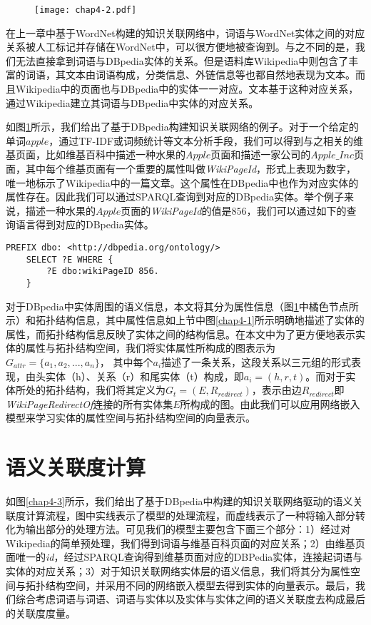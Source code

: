 \begin{figure}[!ht]
    \centerline{\texttt{[image: chap4-2.pdf]}}
    \label{chap4-2}
\end{figure}

在上一章中基于WordNet构建的知识关联网络中，词语与WordNet实体之间的对应关系被人工标记并存储在WordNet中，可以很方便地被查询到。与之不同的是，我们无法直接拿到词语与DBpedia实体的关系。但是语料库Wikipedia中则包含了丰富的词语，其文本由词语构成，分类信息、外链信息等也都自然地表现为文本。而且Wikipedia中的页面也与DBpedia中的实体一一对应。文本基于这种对应关系，通过Wikipedia建立其词语与DBpedia中实体的对应关系。

如图\ref{chap4-2}所示，我们给出了基于DBpedia构建知识关联网络的例子。对于一个给定的单词$apple$，通过TF-IDF或词频统计等文本分析手段，我们可以得到与之相关的维基页面，比如维基百科中描述一种水果的$Apple$页面和描述一家公司的$Apple\_Inc$页面，其中每个维基页面有一个重要的属性叫做\emph{WikiPageId}，形式上表现为数字，唯一地标示了Wikipedia中的一篇文章。这个属性在DBpedia中也作为对应实体的属性存在。因此我们可以通过SPARQL查询到对应的DBpedia实体。举个例子来说，描述一种水果的$Apple$页面的\emph{WikiPageId}的值是$856$，我们可以通过如下的查询语言得到对应的DBpedia实体。

\begin{lstlisting}[basicstyle=\fontsize{10}{11}\ttfamily,aboveskip=1em,frame=shadowbox]
    PREFIX dbo: <http://dbpedia.org/ontology/>
    SELECT ?E WHERE {
        ?E dbo:wikiPageID 856.
    }
\end{lstlisting}

对于DBpedia中实体周围的语义信息，本文将其分为属性信息（图\ref{chap4-2}中橘色节点所示）和拓扑结构信息，其中属性信息如上节中图\ref{chap4-1}所示明确地描述了实体的属性，而拓扑结构信息反映了实体之间的结构信息。在本文中为了更方便地表示实体的属性与拓扑结构空间，我们将实体属性所构成的图表示为$G_{attr} = \{a_1, a_2, ..., a_n\}$， 其中每个$a_i$描述了一条关系，这段关系以三元组的形式表现，由头实体（h）、关系（r）和尾实体（t）构成，即$a_i = (h, r, t)$。而对于实体所处的拓扑结构，我们将其定义为$G_{t} = (E, R_{redirect})$，表示由边$R_{redirect}$即\emph{WikiPageRedirectOf}连接的所有实体集$E$所构成的图。由此我们可以应用网络嵌入模型来学习实体的属性空间与拓扑结构空间的向量表示。

\section{语义关联度计算}
如图\ref{chap4-3}所示，我们给出了基于DBpedia中构建的知识关联网络驱动的语义关联度计算流程，图中实线表示了模型的处理流程，而虚线表示了一种将输入部分转化为输出部分的处理方法。可见我们的模型主要包含下面三个部分：1）经过对Wikipedia的简单预处理，我们得到词语与维基百科页面的对应关系；2）由维基页面唯一的\emph{id}，经过SPARQL查询得到维基页面对应的DBPedia实体，连接起词语与实体的对应关系；3）对于知识关联网络实体层的语义信息，我们将其分为属性空间与拓扑结构空间，并采用不同的网络嵌入模型去得到实体的向量表示。最后，我们综合考虑词语与词语、词语与实体以及实体与实体之间的语义关联度去构成最后的关联度度量。

